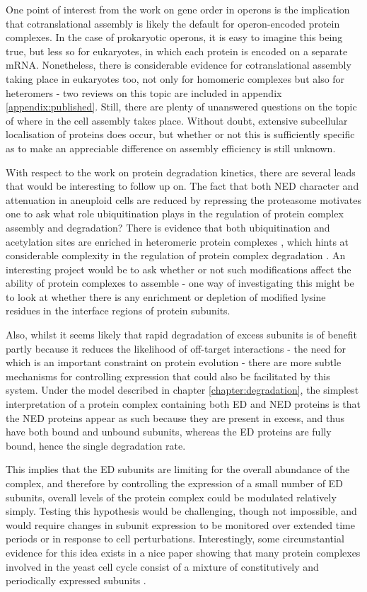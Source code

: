 \documentclass[a4paper,11pt,twoside,openright]{scrbook}
\begin{document}
One point of interest from the work on gene order in operons is the implication
that cotranslational assembly is likely the default for operon-encoded protein
complexes. In the case of prokaryotic operons, it is easy to imagine this being
true, but less so for eukaryotes, in which each protein is encoded on a separate
mRNA. Nonetheless, there is considerable evidence for cotranslational assembly
taking place in eukaryotes too, not only for homomeric complexes but also for
heteromers - two reviews on this topic are included in appendix
\ref{appendix:published}. Still, there are plenty of unanswered questions on the
topic of where in the cell assembly takes place. Without doubt, extensive
subcellular localisation of proteins does occur, but whether or not this is
sufficiently specific as to make an appreciable difference on assembly
efficiency is still unknown.

With respect to the work on protein degradation kinetics, there are several
leads that would be interesting to follow up on. The fact that both NED
character and attenuation in aneuploid cells are reduced by repressing the
proteasome motivates one to ask what role ubiquitination plays in the regulation
of protein complex assembly and degradation? There is evidence that both
ubiquitination and acetylation sites are enriched in heteromeric protein
complexes \cite{Chen2014,Choudhary2009}, which hints at considerable complexity
in the regulation of protein complex degradation \cite{Caron2005}. An
interesting project would be to ask whether or not such modifications affect the
ability of protein complexes to assemble - one way of investigating this might
be to look at whether there is any enrichment or depletion of modified lysine
residues in the interface regions of protein subunits.

Also, whilst it seems likely that rapid degradation of excess subunits is of
benefit partly because it reduces the likelihood of off-target interactions  -
the need for which is an important constraint on protein evolution
\cite{Yang2012} - there are more subtle mechanisms for controlling expression
that could also be facilitated by this system. Under the model described in
chapter \ref{chapter:degradation}, the simplest interpretation of a protein
complex containing both ED and NED proteins is that the NED proteins appear as
such because they are present in excess, and thus have both bound and unbound
subunits, whereas the ED proteins are fully bound, hence the single degradation
rate.

This implies that the ED subunits are limiting for the overall abundance of the
complex, and therefore by controlling the expression of a small number of ED
subunits, overall levels of the protein complex could be modulated relatively
simply. Testing this hypothesis would be challenging, though not impossible, and
would require changes in subunit expression to be monitored over extended time
periods or in response to cell perturbations. Interestingly, some circumstantial
evidence for this idea exists in a nice paper showing that many protein
complexes involved in the yeast cell cycle consist of a mixture of
constitutively and periodically expressed subunits \cite{Lichtenberg2005}.
\end{document}
